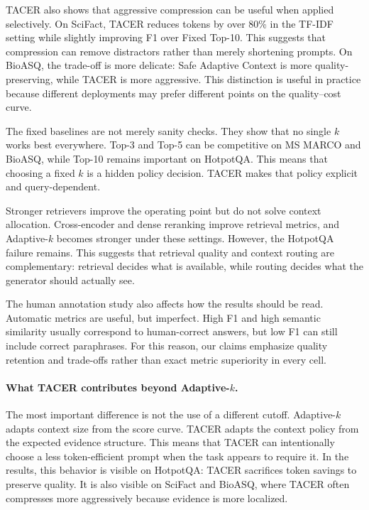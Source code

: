\documentclass[11pt]{article}
\begin{document}
TACER also shows that aggressive compression can be useful when applied selectively. On SciFact, TACER reduces tokens by over 80\% in the TF-IDF setting while slightly improving F1 over Fixed Top-10. This suggests that compression can remove distractors rather than merely shortening prompts. On BioASQ, the trade-off is more delicate: Safe Adaptive Context is more quality-preserving, while TACER is more aggressive. This distinction is useful in practice because different deployments may prefer different points on the quality--cost curve.

The fixed baselines are not merely sanity checks. They show that no single $k$ works best everywhere. Top-3 and Top-5 can be competitive on MS MARCO and BioASQ, while Top-10 remains important on HotpotQA. This means that choosing a fixed $k$ is a hidden policy decision. TACER makes that policy explicit and query-dependent.

Stronger retrievers improve the operating point but do not solve context allocation. Cross-encoder and dense reranking improve retrieval metrics, and Adaptive-$k$ becomes stronger under these settings. However, the HotpotQA failure remains. This suggests that retrieval quality and context routing are complementary: retrieval decides what is available, while routing decides what the generator should actually see.

The human annotation study also affects how the results should be read. Automatic metrics are useful, but imperfect. High F1 and high semantic similarity usually correspond to human-correct answers, but low F1 can still include correct paraphrases. For this reason, our claims emphasize quality retention and trade-offs rather than exact metric superiority in every cell.

\paragraph{What TACER contributes beyond Adaptive-$k$.}
The most important difference is not the use of a different cutoff. Adaptive-$k$ adapts context size from the score curve. TACER adapts the context policy from the expected evidence structure. This means that TACER can intentionally choose a less token-efficient prompt when the task appears to require it. In the results, this behavior is visible on HotpotQA: TACER sacrifices token savings to preserve quality. It is also visible on SciFact and BioASQ, where TACER often compresses more aggressively because evidence is more localized.
\end{document}
